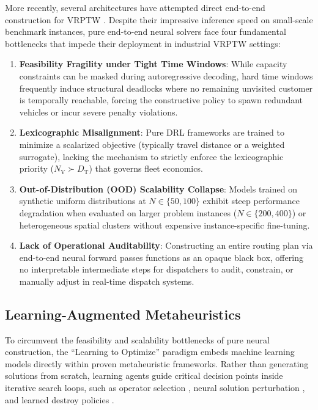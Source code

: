 \documentclass{ieeeaccess}
\newcommand{\NV}{{N_\mathrm{V}}}
\newcommand{\TD}{{D_\mathrm{T}}}
\begin{document}
More recently, several architectures have attempted direct end-to-end
construction for VRPTW \cite{falkner2020learning, lin2021deep}. Despite their
impressive inference speed on small-scale benchmark instances, pure
end-to-end neural solvers face four fundamental bottlenecks that impede their
deployment in industrial VRPTW settings:

\begin{enumerate}
    \item \textbf{Feasibility Fragility under Tight Time Windows}: While capacity
    constraints can be masked during autoregressive decoding, hard time windows
    frequently induce structural deadlocks where no remaining unvisited customer
    is temporally reachable, forcing the constructive policy to spawn redundant
    vehicles or incur severe penalty violations.
    \item \textbf{Lexicographic Misalignment}: Pure DRL frameworks are trained
    to minimize a scalarized objective (typically travel distance or a
    weighted surrogate), lacking the mechanism to strictly enforce the
    lexicographic priority ($\NV \succ \TD$) that governs fleet economics.
    \item \textbf{Out-of-Distribution (OOD) Scalability Collapse}: Models trained
    on synthetic uniform distributions at $N \in \{50, 100\}$ exhibit steep
    performance degradation when evaluated on larger problem instances
    ($N \in \{200, 400\}$) or heterogeneous spatial clusters without expensive
    instance-specific fine-tuning.
    \item \textbf{Lack of Operational Auditability}: Constructing an entire routing
    plan via end-to-end neural forward passes functions as an opaque black box,
    offering no interpretable intermediate steps for dispatchers to audit,
    constrain, or manually adjust in real-time dispatch systems.
\end{enumerate}

\subsection{Learning-Augmented Metaheuristics}
\label{sec:rw_hybrid}

To circumvent the feasibility and scalability bottlenecks of pure neural construction, the ``Learning to Optimize'' paradigm \cite{bengio2021machine} embeds machine learning models directly within proven metaheuristic frameworks. Rather than generating solutions from scratch, learning agents guide critical decision points inside iterative search loops, such as operator selection \cite{syberfeldt2009reinforcement, lu2020learning}, neural solution perturbation \cite{chen2019learning}, and learned destroy policies \cite{hottung2020neural, son2023learning}.
\end{document}
